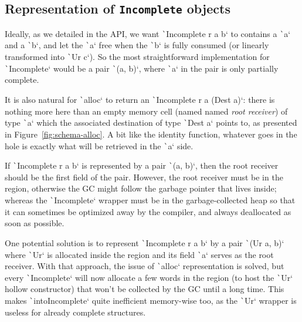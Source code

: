\documentclass[english]{jflart}
\begin{document}
\subsection{Representation of \texttt{Incomplete} objects}

Ideally, as we detailed in the API, we want \texttt`Incomplete r a b` to contains a \texttt`a` and a \texttt`b`, and let the \texttt`a` free when the \texttt`b` is fully consumed (or linearly transformed into \texttt`Ur c`). So the most straightforward implementation for \texttt`Incomplete` would be a pair \texttt`(a, b)`, where \texttt`a` in the pair is only partially complete.

It is also natural for \texttt`alloc` to return an \texttt`Incomplete r a (Dest a)`: there is nothing more here than an empty memory cell (named named \emph{root receiver}) of type \texttt`a` which the associated destination of type \texttt`Dest a` points to, as presented in Figure~\ref{fig:schema-alloc}. A bit like the identity function, whatever goes in the hole is exactly what will be retrieved in the \texttt`a` side.

If \texttt`Incomplete r a b` is represented by a pair \texttt`(a, b)`, then the root receiver should be the first field of the pair. However, the root receiver must be in the region, otherwise the GC might follow the garbage pointer that lives inside; whereas the \texttt`Incomplete` wrapper must be in the garbage-collected heap so that it can sometimes be optimized away by the compiler, and always deallocated as soon as possible.

One potential solution is to represent \texttt`Incomplete r a b` by a pair \texttt`(Ur a, b)` where \texttt`Ur` is allocated inside the region and its field \texttt`a` serves as the root receiver. With that approach, the issue of \texttt`alloc` representation is solved, but every \texttt`Incomplete` will now allocate a few words in the region (to host the \texttt`Ur` hollow constructor) that won't be collected by the GC until a long time. This makes \texttt`intoIncomplete` quite inefficient memory-wise too, as the \texttt`Ur` wrapper is useless for already complete structures.
\end{document}
